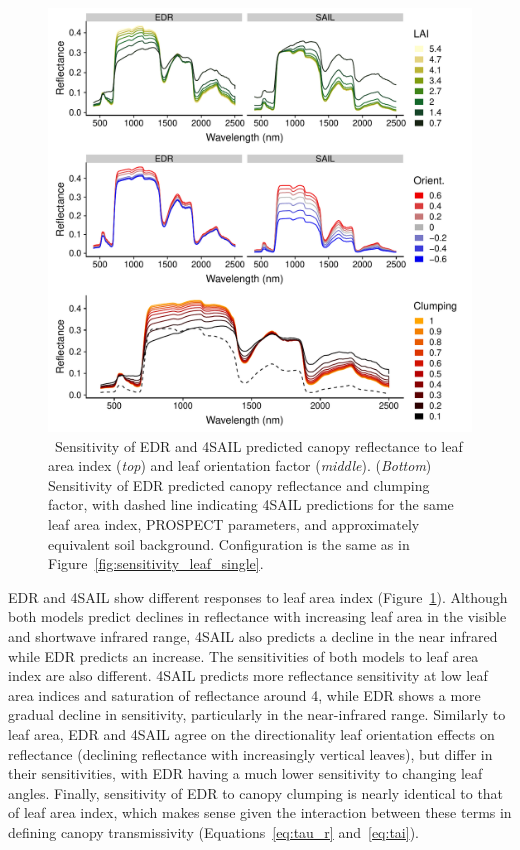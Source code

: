 \begin{figure}
  \centering
  \includegraphics[width=\textwidth]{4_edr/figures/explore_spectra/sensitivity_single_pft.pdf}
  \caption{\
    Sensitivity of EDR and 4SAIL predicted canopy reflectance to leaf area index (\textit{top}) and leaf orientation factor (\textit{middle}).
    (\textit{Bottom}) Sensitivity of EDR predicted canopy reflectance and clumping factor,
    with dashed line indicating 4SAIL predictions for the same leaf area index, PROSPECT parameters, and approximately equivalent soil background.
    Configuration is the same as in Figure~\ref{fig:sensitivity_leaf_single}.
  }\label{fig:sensitivity_structure_single}
\end{figure}

EDR and 4SAIL show different responses to leaf area index (Figure~\ref{fig:sensitivity_structure_single}).
Although both models predict declines in reflectance with increasing leaf area in the visible and shortwave infrared range,
4SAIL also predicts a decline in the near infrared while EDR predicts an increase.
The sensitivities of both models to leaf area index are also different.
4SAIL predicts more reflectance sensitivity at low leaf area indices and saturation of reflectance around 4, while EDR shows a more gradual decline in sensitivity, particularly in the near-infrared range. 
Similarly to leaf area, EDR and 4SAIL agree on the directionality leaf orientation effects on reflectance (declining reflectance with increasingly vertical leaves), but differ in their sensitivities, with EDR having a much lower sensitivity to changing leaf angles.
Finally, sensitivity of EDR to canopy clumping is nearly identical to that of leaf area index, which makes sense given the interaction between these terms in defining canopy transmissivity (Equations~\ref{eq:tau_r} and~\ref{eq:tai}).

